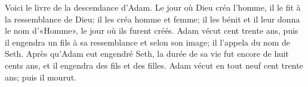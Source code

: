 Voici le livre de la descendance d’Adam.
Le jour où Dieu créa l’homme, il le fit à la ressemblance de Dieu;
	il les créa homme et femme;
	il les bénit et il leur donna le nom d’«Homme», le jour où ils furent créés.
Adam vécut cent trente ans,
	puis il engendra un fils à sa ressemblance et selon son image;
	il l’appela du nom de Seth.
Après qu’Adam eut engendré Seth,
	la durée de sa vie fut encore de huit cents ans,
	et il engendra des fils et des filles.
Adam vécut en tout neuf cent trente ans; puis il mourut.
